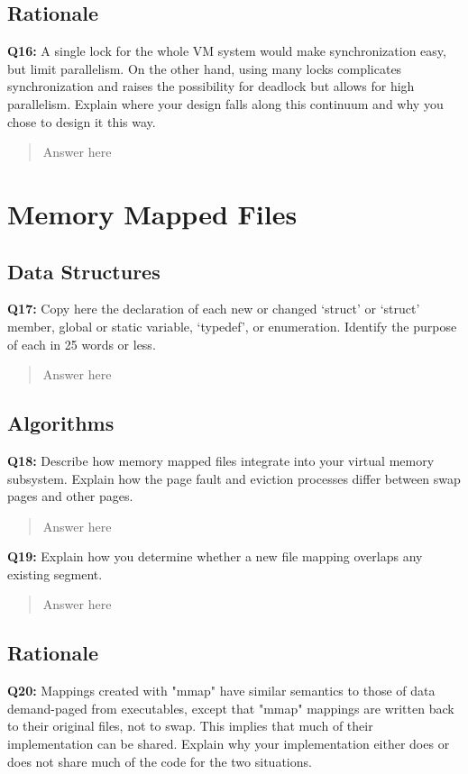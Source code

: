 \documentclass[a4paper,11pt]{paper}
\begin{document}
\subsection{Rationale}

\textbf{Q16:} A single lock for the whole VM system would make synchronization easy, but limit parallelism.  On the other hand, using many locks complicates synchronization and raises the possibility for deadlock but allows for high parallelism.  Explain where your design falls along this continuum and why you chose to design it this way.
\begin{quote}
  Answer here
\end{quote}


\section{Memory Mapped Files}

\subsection{Data Structures}

\textbf{Q17:} Copy here the declaration of each new or changed `struct' or `struct' member, global or static variable, `typedef', or enumeration.  Identify the purpose of each in 25 words or less.
\begin{quote}
  Answer here
\end{quote}

\subsection{Algorithms}

\textbf{Q18:} Describe how memory mapped files integrate into your virtual memory subsystem.  Explain how the page fault and eviction processes differ between swap pages and other pages.
\begin{quote}
  Answer here
\end{quote}

\textbf{Q19:} Explain how you determine whether a new file mapping overlaps any existing segment.
\begin{quote}
  Answer here
\end{quote}

\subsection{Rationale}
\textbf{Q20:} Mappings created with "mmap" have similar semantics to those of data demand-paged from executables, except that "mmap" mappings are written back to their original files, not to swap.  This implies that much of their implementation can be shared.  Explain why your implementation either does or does not share much of the code for the two situations.
\end{document}
